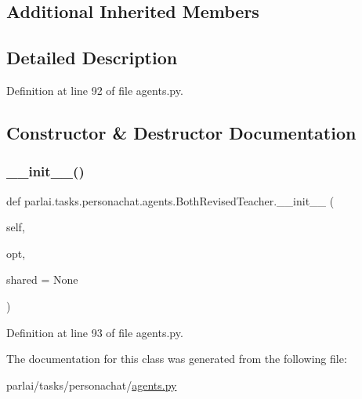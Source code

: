 \subsection*{Additional Inherited Members}


\subsection{Detailed Description}


Definition at line 92 of file agents.\+py.



\subsection{Constructor \& Destructor Documentation}
\mbox{\label{classparlai_1_1tasks_1_1personachat_1_1agents_1_1BothRevisedTeacher_ad79201b85afa5bfebc40d962550493f8}} 
\subsubsection{\texorpdfstring{\+\_\+\+\_\+init\+\_\+\+\_\+()}{\_\_init\_\_()}}
{\footnotesize\ttfamily def parlai.\+tasks.\+personachat.\+agents.\+Both\+Revised\+Teacher.\+\_\+\+\_\+init\+\_\+\+\_\+ (\begin{DoxyParamCaption}\item[{}]{self,  }\item[{}]{opt,  }\item[{}]{shared = {\ttfamily None} }\end{DoxyParamCaption})}



Definition at line 93 of file agents.\+py.



The documentation for this class was generated from the following file\+:\begin{DoxyCompactItemize}
\item 
parlai/tasks/personachat/\hyperlink{parlai_2tasks_2personachat_2agents_8py}{agents.\+py}\end{DoxyCompactItemize}
